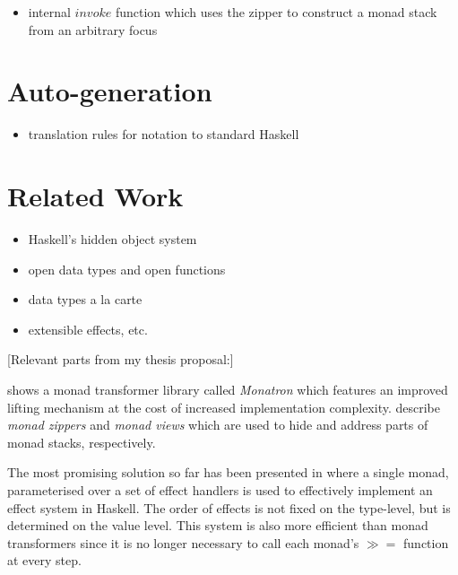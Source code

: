 \documentclass[runningheads,a4paper]{llncs}
\newcommand{\todo}[1]{[{\color{blue}#1}]}
\begin{document}
\begin{itemize}
\item internal $\mathit{invoke}$ function which uses the zipper to construct a monad stack from an arbitrary focus
\end{itemize}

\section{Auto-generation}
\label{sec:auto}

\begin{itemize}
\item translation rules for notation to standard Haskell
\end{itemize}

\section{Related Work}
\label{sec:related}

\begin{itemize}
\item Haskell's hidden object system
\item open data types and open functions
\item data types a la carte
\item extensible effects, etc.
\end{itemize}

\todo{Relevant parts from my thesis proposal:}

\cite{jaskelioff2011monatron} shows a monad transformer library called \emph{Monatron} which features an improved lifting mechanism at the cost of increased implementation complexity. \cite{schrijvers2011monads} describe \emph{monad zippers} and \emph{monad views} which are used to hide and address parts of monad stacks, respectively.

The most promising solution so far has been presented in \cite{kiselyov2013extensible} where a single monad, parameterised over a set of effect handlers \cite{plotkin2009handlers} is used to effectively implement an effect system in Haskell. The order of effects is not fixed on the type-level, but is determined on the value level. This system is also more efficient than monad transformers since it is no longer necessary to call each monad's $\gg\!\!=$ function at every step. 

\end{document}
